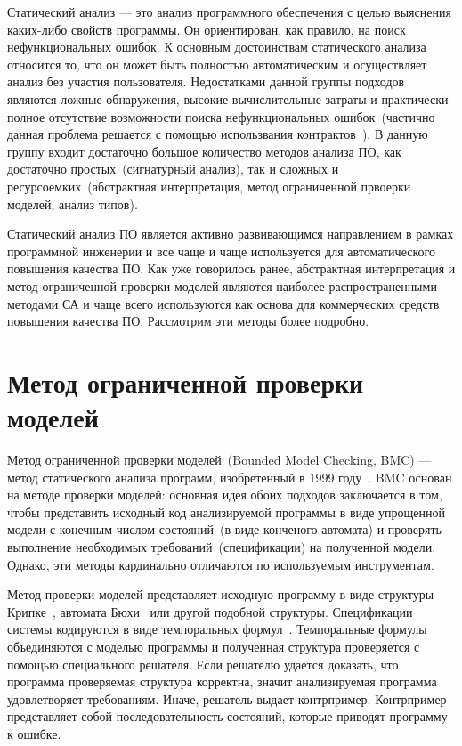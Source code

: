 Статический анализ --- это анализ программного обеспечения с целью выяснения 
каких-либо свойств программы. Он ориентирован, как правило, на поиск
нефункциональных ошибок. К основным достоинствам статического анализа
относится то, что он может быть полностью автоматическим и осуществляет 
анализ без участия пользователя. Недостатками данной группы подходов
являются ложные обнаружения, высокие вычислительные затраты и практически полное
отсутствие возможности поиска нефункциональных ошибок~(частично данная проблема 
решается с помощью использвания контрактов~\cite{designByContract}). В данную
группу входит достаточно большое количество методов анализа ПО, как достаточно
простых~(сигнатурный анализ), так и сложных и ресурсоемких~(абстрактная 
интерпретация, метод ограниченной првоерки моделей, анализ типов).

Статический анализ ПО является активно развивающимся направлением в рамках
программной инженерии и все чаще и чаще используется для автоматического 
повышения качества ПО. Как уже говорилось ранее, абстрактная интерпретация и 
метод ограниченной проверки моделей являются наиболее распространенными 
методами СА и чаще всего используются как основа для коммерческих средств
повышения качества ПО. Рассмотрим эти методы более подробно.

\section{Метод ограниченной проверки моделей}

Метод ограниченной проверки моделей~(Bounded Model Checking, BMC) --- метод
статического анализа программ, изобретенный в 1999 году~\cite{symbolicModelChecking}.
BMC основан на методе проверки моделей: основная идея обоих подходов заключается
в том, чтобы представить исходный код анализируемой программы в виде упрощенной
модели с конечным числом состояний~(в виде конченого автомата) и проверять 
выполнение необходимых требований~(спецификации) на полученной модели. Однако, 
эти методы кардинально отличаются по используемым инструментам.

Метод проверки моделей представляет исходную программу в виде структуры 
Крипке~\cite{kripkeModel}, автомата Бюхи~\cite{buchiAutomata} или другой 
подобной структуры. Спецификации системы кодируются в виде темпоральных 
формул~\cite{temporalLogic}. Темпоральные формулы объединяются с моделью программы и полученная структура проверяется с помощью специального решателя. 
Если решателю удается доказать, что программа проверяемая структура корректна, 
значит анализируемая программа удовлетворяет требованиям. Иначе, решатель выдает
контрпример. Контрпример представляет собой последовательность состояний,
которые приводят программу к ошибке.

